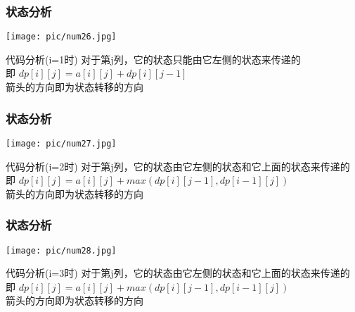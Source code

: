 \documentclass{beamer}
\begin{document}
\begin{frame}[fragile]
\frametitle{状态分析}
\begin{minipage}[b]{0.30\linewidth}
	\texttt{[image: pic/num26.jpg]}
\end{minipage}
\hfill
\begin{minipage}[b]{0.55\linewidth}
	\begin{block}{代码分析(i=1时)}
	对于第j列，它的状态只能由它左侧的状态来传递的\\
	即 $dp[i][j] = a[i][j] + dp[i][j-1]$\\
	箭头的方向即为状态转移的方向
	\end{block}
\end{minipage}
\end{frame}
\begin{frame}[fragile]
\frametitle{状态分析}
\begin{minipage}[b]{0.30\linewidth}
	\texttt{[image: pic/num27.jpg]}
\end{minipage}
\hfill
\begin{minipage}[b]{0.55\linewidth}
	\begin{block}{代码分析(i=2时)}
	对于第j列，它的状态由它左侧的状态和它上面的状态来传递的\\
	即 $dp[i][j] = a[i][j] + max(dp[i][j-1], dp[i-1][j])$\\
	箭头的方向即为状态转移的方向
	\end{block}	
\end{minipage}
\end{frame}
\begin{frame}[fragile]
\frametitle{状态分析}
\begin{minipage}[b]{0.30\linewidth}
	\texttt{[image: pic/num28.jpg]}
\end{minipage}
\hfill
\begin{minipage}[b]{0.55\linewidth}
	\begin{block}{代码分析(i=3时)}
	对于第j列，它的状态由它左侧的状态和它上面的状态来传递的\\
	即 $dp[i][j] = a[i][j] + max(dp[i][j-1], dp[i-1][j])$\\
	箭头的方向即为状态转移的方向
	\end{block}	
\end{minipage}
\end{frame}
\end{document}
